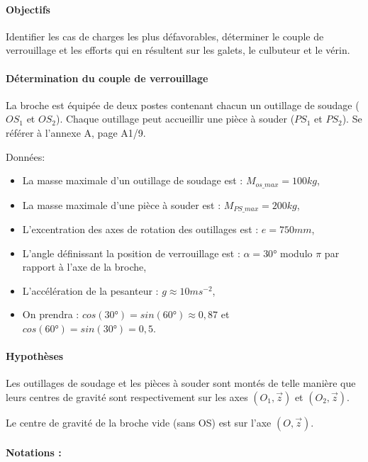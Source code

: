 \paragraph{Objectifs}

Identifier les cas de charges les plus défavorables, déterminer le couple de verrouillage et les efforts qui en résultent sur les galets, le culbuteur et le vérin.

\paragraph{Détermination du couple de verrouillage}

La broche est équipée de deux postes contenant chacun un outillage de soudage ($OS_1$ et $OS_2$). Chaque outillage peut accueillir une pièce à souder ($PS_1$ et $PS_2$). Se référer à l’annexe A, page A1/9.

Données:
\begin{itemize}
 \item La masse maximale d’un outillage de soudage est : $M_{os\_max}=  100kg$,
 \item La masse maximale d’une pièce à souder est : $M_{PS\_max}=200kg$,
 \item L’excentration des axes de rotation des outillages est : $e=750mm$,
 \item L’angle définissant la position de verrouillage est : $\alpha=30°$ modulo $\pi$ par rapport à l’axe de la broche,
 \item L’accélération de la pesanteur : $g\approx 10ms^{-2}$,
 \item On prendra : $cos(30°)=sin(60°)\approx 0,87$ et $cos(60°)=sin(30°)=0,5$.
\end{itemize}

\paragraph{Hypothèses}

Les outillages de soudage et les pièces à souder sont montés de telle manière que leurs centres de gravité sont respectivement sur les axes $(O_1,\vec{z})$ et $(O_2,\vec{z})$.

Le centre de gravité de la broche vide (sans OS) est sur l’axe $(O,\vec{z})$.

\paragraph{Notations :}

